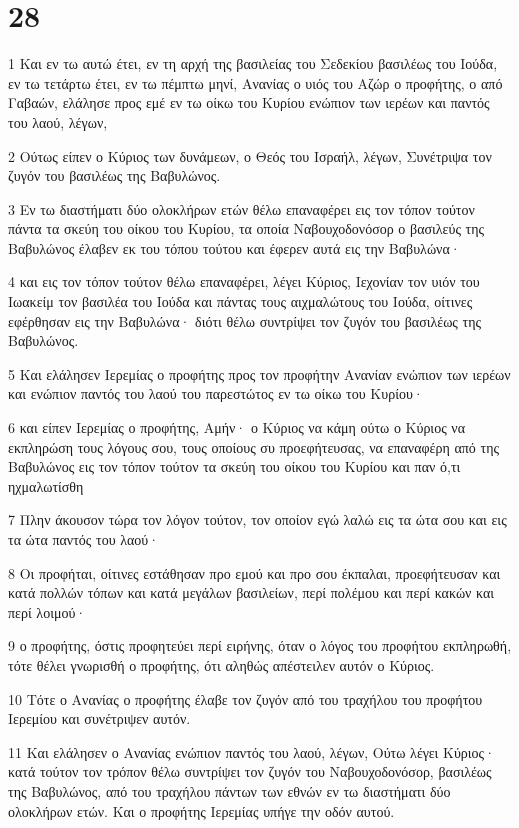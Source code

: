\chapter{28}

\par 1 Και εν τω αυτώ έτει, εν τη αρχή της βασιλείας του Σεδεκίου βασιλέως του Ιούδα, εν τω τετάρτω έτει, εν τω πέμπτω μηνί, Ανανίας ο υιός του Αζώρ ο προφήτης, ο από Γαβαών, ελάλησε προς εμέ εν τω οίκω του Κυρίου ενώπιον των ιερέων και παντός του λαού, λέγων,
\par 2 Ούτως είπεν ο Κύριος των δυνάμεων, ο Θεός του Ισραήλ, λέγων, Συνέτριψα τον ζυγόν του βασιλέως της Βαβυλώνος.
\par 3 Εν τω διαστήματι δύο ολοκλήρων ετών θέλω επαναφέρει εις τον τόπον τούτον πάντα τα σκεύη του οίκου του Κυρίου, τα οποία Ναβουχοδονόσορ ο βασιλεύς της Βαβυλώνος έλαβεν εκ του τόπου τούτου και έφερεν αυτά εις την Βαβυλώνα·
\par 4 και εις τον τόπον τούτον θέλω επαναφέρει, λέγει Κύριος, Ιεχονίαν τον υιόν του Ιωακείμ τον βασιλέα του Ιούδα και πάντας τους αιχμαλώτους του Ιούδα, οίτινες εφέρθησαν εις την Βαβυλώνα· διότι θέλω συντρίψει τον ζυγόν του βασιλέως της Βαβυλώνος.
\par 5 Και ελάλησεν Ιερεμίας ο προφήτης προς τον προφήτην Ανανίαν ενώπιον των ιερέων και ενώπιον παντός του λαού του παρεστώτος εν τω οίκω του Κυρίου·
\par 6 και είπεν Ιερεμίας ο προφήτης, Αμήν· ο Κύριος να κάμη ούτω ο Κύριος να εκπληρώση τους λόγους σου, τους οποίους συ προεφήτευσας, να επαναφέρη από της Βαβυλώνος εις τον τόπον τούτον τα σκεύη του οίκου του Κυρίου και παν ό,τι ηχμαλωτίσθη
\par 7 Πλην άκουσον τώρα τον λόγον τούτον, τον οποίον εγώ λαλώ εις τα ώτα σου και εις τα ώτα παντός του λαού·
\par 8 Οι προφήται, οίτινες εστάθησαν προ εμού και προ σου έκπαλαι, προεφήτευσαν και κατά πολλών τόπων και κατά μεγάλων βασιλείων, περί πολέμου και περί κακών και περί λοιμού·
\par 9 ο προφήτης, όστις προφητεύει περί ειρήνης, όταν ο λόγος του προφήτου εκπληρωθή, τότε θέλει γνωρισθή ο προφήτης, ότι αληθώς απέστειλεν αυτόν ο Κύριος.
\par 10 Τότε ο Ανανίας ο προφήτης έλαβε τον ζυγόν από του τραχήλου του προφήτου Ιερεμίου και συνέτριψεν αυτόν.
\par 11 Και ελάλησεν ο Ανανίας ενώπιον παντός του λαού, λέγων, Ούτω λέγει Κύριος· κατά τούτον τον τρόπον θέλω συντρίψει τον ζυγόν του Ναβουχοδονόσορ, βασιλέως της Βαβυλώνος, από του τραχήλου πάντων των εθνών εν τω διαστήματι δύο ολοκλήρων ετών. Και ο προφήτης Ιερεμίας υπήγε την οδόν αυτού.
